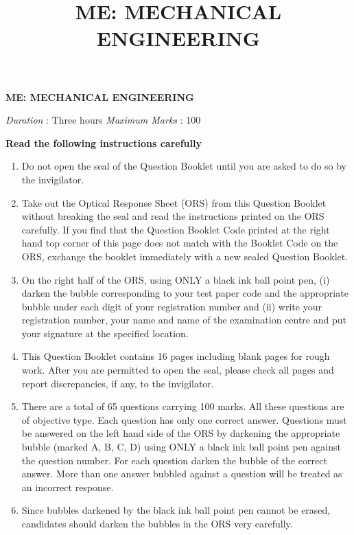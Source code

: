 \documentclass[journal,11pt,onecolumn]{IEEEtran}
\title{ME: MECHANICAL ENGINEERING}
\begin{document}
\begin{center}
    \Large
    \textbf{ME: MECHANICAL ENGINEERING}
\end{center}

\textit{Duration} : Three hours
\hfill
\textit{Maximum Marks} : 100


\textbf{Read the following instructions carefully}

\begin{enumerate}
    \item Do not open the seal of the Question Booklet until you are asked to do so by the invigilator.

    \item Take out the Optical Response Sheet (ORS) from this Question Booklet without breaking the seal and read the instructions printed on the ORS carefully. If you find that the Question Booklet Code printed at the right hand top corner of this page does not match with the Booklet Code on the ORS, exchange the booklet immediately with a new sealed Question Booklet.

    \item On the right half of the ORS, using ONLY a black ink ball point pen, (i) darken the bubble corresponding to your test paper code and the appropriate bubble under each digit of your registration number and (ii) write your registration number, your name and name of the examination centre and put your signature at the specified location.

    \item This Question Booklet contains 16 pages including blank pages for rough work. After you are permitted to open the seal, please check all pages and report discrepancies, if any, to the invigilator.

    \item There are a total of 65 questions carrying 100 marks. All these questions are of objective type. Each question has only one correct answer. Questions must be answered on the left hand side of the ORS by darkening the appropriate bubble (marked A, B, C, D) using ONLY a black ink ball point pen against the question number. For each question darken the bubble of the correct answer. More than one answer bubbled against a question will be treated as an incorrect response.

    \item Since bubbles darkened by the black ink ball point pen cannot be erased, candidates should darken the bubbles in the ORS very carefully.


\end{enumerate}
\end{document}
